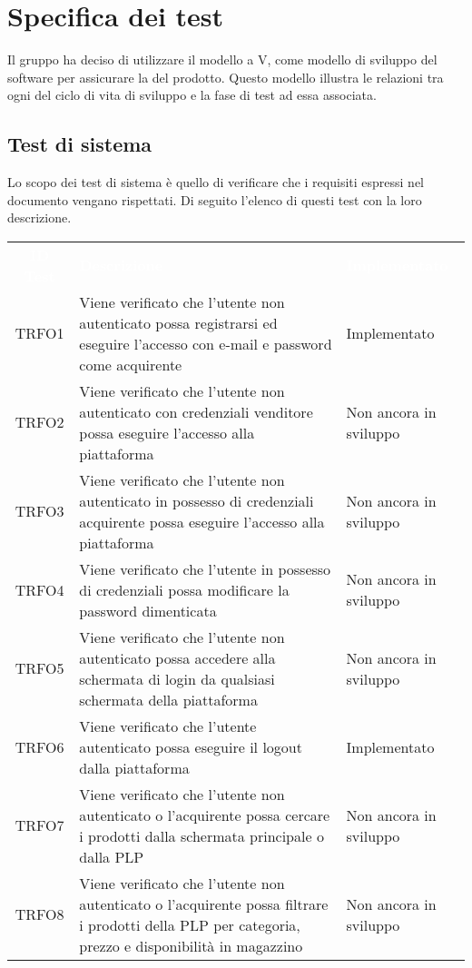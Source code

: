 \section{Specifica dei test}
\label{specificatest}
Il gruppo ha deciso di utilizzare il modello a V, come modello di sviluppo del software per assicurare la  del prodotto. Questo modello illustra le relazioni tra ogni  del ciclo di vita di sviluppo e la fase di test ad essa associata.
\subsection{Test di sistema}
Lo scopo dei test di sistema è quello di verificare che i requisiti espressi nel documento \AdR{} vengano rispettati. Di seguito l'elenco di questi test con la loro descrizione.
\begin{longtable}{|c| C{10cm} |C{3cm}|}
	\textcolor{white}{\textbf{ID Test}}&
	\textcolor{white}{\textbf{Descrizione}}&
	\textcolor{white}{\textbf{Implementato}}\label{tab:TestSistema1}\\
	TRFO1 & Viene verificato che l'utente non autenticato possa registrarsi ed eseguire l'accesso  con e-mail e password come acquirente & Implementato\\ \hline
	TRFO2 & Viene verificato che l'utente non autenticato con credenziali venditore possa eseguire l'accesso alla piattaforma & Non ancora in sviluppo\\ \hline
	TRFO3 & Viene verificato che l'utente non autenticato in possesso di credenziali acquirente possa eseguire l'accesso alla piattaforma & Non ancora in sviluppo \\ \hline
	TRFO4 & Viene verificato che l'utente in possesso di credenziali possa modificare la password dimenticata & Non ancora in sviluppo\\ \hline
	TRFO5 & Viene verificato che l'utente non autenticato possa accedere alla schermata di login da qualsiasi schermata della piattaforma & Non ancora in sviluppo\\ \hline
	TRFO6 & Viene verificato che l'utente autenticato possa eseguire il logout dalla piattaforma & Implementato\\ \hline
	TRFO7 & Viene verificato che l'utente non autenticato o l'acquirente possa cercare i prodotti dalla schermata principale o dalla PLP & Non ancora in sviluppo\\ \hline
	TRFO8 & Viene verificato che l'utente non autenticato o l'acquirente possa filtrare i prodotti della PLP per categoria, prezzo e disponibilità in magazzino & Non ancora in sviluppo\\ \hline

\end{longtable}
